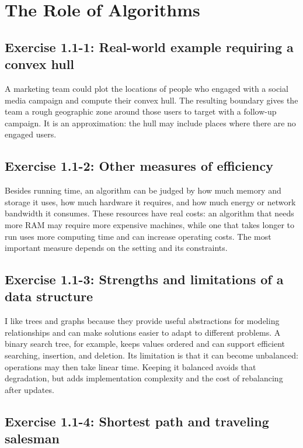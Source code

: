 \chapter{The Role of Algorithms}

\section{Exercise 1.1-1: Real-world example requiring a convex hull}

A marketing team could plot the locations of people who engaged with a social
media campaign and compute their convex hull. The resulting boundary gives the
team a rough geographic zone around those users to target with a follow-up
campaign. It is an approximation: the hull may include places where there are
no engaged users.

\section{Exercise 1.1-2: Other measures of efficiency}

Besides running time, an algorithm can be judged by how much memory and storage
it uses, how much hardware it requires, and how much energy or network bandwidth
it consumes. These resources have real costs: an algorithm that needs more RAM
may require more expensive machines, while one that takes longer to run uses
more computing time and can increase operating costs. The most important measure
depends on the setting and its constraints.

\section{Exercise 1.1-3: Strengths and limitations of a data structure}

I like trees and graphs because they provide useful abstractions for modeling
relationships and can make solutions easier to adapt to different problems. A
binary search tree, for example, keeps values ordered and can support efficient
searching, insertion, and deletion. Its limitation is that it can become
unbalanced: operations may then take linear time. Keeping it balanced avoids
that degradation, but adds implementation complexity and the cost of
rebalancing after updates.

\section{Exercise 1.1-4: Shortest path and traveling salesman}

